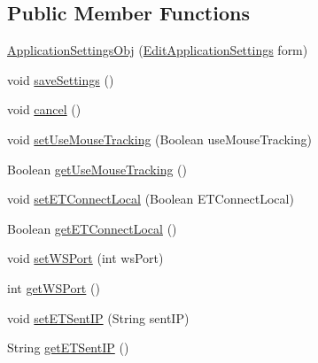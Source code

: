 \subsection*{Public Member Functions}
\begin{DoxyCompactItemize}
\item 
\hyperlink{class_web_analyzer_1_1_u_i_1_1_interaction_objects_1_1_application_settings_obj_a0642bb10f6b638fd83af16a36717a1b4}{Application\+Settings\+Obj} (\hyperlink{class_web_analyzer_1_1_u_i_1_1_edit_application_settings}{Edit\+Application\+Settings} form)
\item 
void \hyperlink{class_web_analyzer_1_1_u_i_1_1_interaction_objects_1_1_application_settings_obj_a25bfafaa8c9da56aaba285bf38fe95c5}{save\+Settings} ()
\item 
void \hyperlink{class_web_analyzer_1_1_u_i_1_1_interaction_objects_1_1_application_settings_obj_a9f4f000c4545b78f94da12994b3b4941}{cancel} ()
\item 
void \hyperlink{class_web_analyzer_1_1_u_i_1_1_interaction_objects_1_1_application_settings_obj_a8963342da04c41af28026f1497c61f32}{set\+Use\+Mouse\+Tracking} (Boolean use\+Mouse\+Tracking)
\item 
Boolean \hyperlink{class_web_analyzer_1_1_u_i_1_1_interaction_objects_1_1_application_settings_obj_a9c6e250f47ac4342fbea778b3078928a}{get\+Use\+Mouse\+Tracking} ()
\item 
void \hyperlink{class_web_analyzer_1_1_u_i_1_1_interaction_objects_1_1_application_settings_obj_a474bee15839a7865a1af2803a7755f80}{set\+E\+T\+Connect\+Local} (Boolean E\+T\+Connect\+Local)
\item 
Boolean \hyperlink{class_web_analyzer_1_1_u_i_1_1_interaction_objects_1_1_application_settings_obj_a42c4eab832591c0046d0d9709742d79d}{get\+E\+T\+Connect\+Local} ()
\item 
void \hyperlink{class_web_analyzer_1_1_u_i_1_1_interaction_objects_1_1_application_settings_obj_a5da6f244c6f2a35fa197070eecf8cd29}{set\+W\+S\+Port} (int ws\+Port)
\item 
int \hyperlink{class_web_analyzer_1_1_u_i_1_1_interaction_objects_1_1_application_settings_obj_a2a7a4913d53f8a212ac7ddcaaa28e9ad}{get\+W\+S\+Port} ()
\item 
void \hyperlink{class_web_analyzer_1_1_u_i_1_1_interaction_objects_1_1_application_settings_obj_a57791b867b39f8081b0db8bfc151269b}{set\+E\+T\+Sent\+I\+P} (String sent\+I\+P)
\item 
String \hyperlink{class_web_analyzer_1_1_u_i_1_1_interaction_objects_1_1_application_settings_obj_a9068e7afcd99a469070610a473e92937}{get\+E\+T\+Sent\+I\+P} ()

\end{DoxyCompactItemize}
